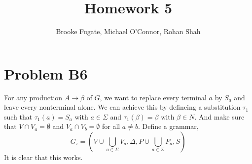 \documentclass[12pt]{article}
\begin{document}
\pagestyle{plain}
\titleformat{\subsection}[runin]
  {\normalfont\large\bfseries}{\thesubsection}{1em}{}

\title{Homework 5}
\author{Brooke Fugate, Michael O'Connor, Rohan Shah}
\date{}

\maketitle

\section*{Problem B6}

For any production $A \rightarrow \beta$ of $G$, we want to replace every terminal $a$ by $S_a$ and leave every nonterminal alone. We can achieve this by defineing a substitution $\tau_1$ such that $\tau_1(a)=S_a$ with $a \in \Sigma$ and $\tau_1(\beta)=\beta$ with $\beta \in N$. And make sure that $V \cap V_a = \emptyset$ and $V_a \cap V_b = \emptyset$ for all $a \neq b$. \newline
Define a grammar, $$G_{\tau} = (V \cup \bigcup_{a \in \Sigma} V_a, \Delta, P \cup \bigcup_{a \in \Sigma} P_a, S)$$ It is clear that this works.
\end{document}
